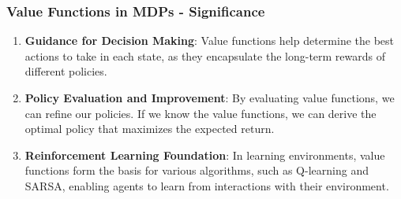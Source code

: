 \documentclass[aspectratio=169]{beamer}
\begin{document}
\begin{frame}[fragile]
    \frametitle{Value Functions in MDPs - Significance}

    \begin{enumerate}
        \item \textbf{Guidance for Decision Making}: Value functions help determine the best actions to take in each state, as they encapsulate the long-term rewards of different policies.
        
        \item \textbf{Policy Evaluation and Improvement}: By evaluating value functions, we can refine our policies. If we know the value functions, we can derive the optimal policy that maximizes the expected return.
        
        \item \textbf{Reinforcement Learning Foundation}: In learning environments, value functions form the basis for various algorithms, such as Q-learning and SARSA, enabling agents to learn from interactions with their environment.
    \end{enumerate}
\end{frame}
\end{document}
